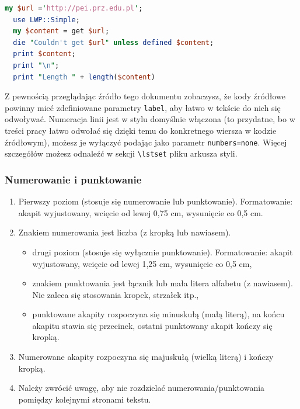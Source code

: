 \documentclass[12pt,twoside]{article}
\begin{document}
\begin{lstlisting}[language=Perl,caption=Listing programu Perl,label={KodPerl1}]
  my $url ='http://pei.prz.edu.pl';
  use LWP::Simple;
  my $content = get $url;
  die "Couldn't get $url" unless defined $content;
  print $content;
  print "\n";
  print "Length " + length($content)
\end{lstlisting}

Z pewnością przeglądając źródło tego dokumentu zobaczysz, że kody źródłowe powinny mieć zdefiniowane parametry \verb|label|, aby łatwo w tekście do nich się odwoływać.
Numeracja linii jest w stylu domyślnie włączona (to przydatne, bo w treści pracy łatwo odwołać się dzięki temu do konkretnego wiersza w kodzie źródłowym), możesz je wyłączyć podając jako parametr \verb|numbers=none|. Więcej szczegółów możesz odnaleźć w sekcji \verb|\lstset| pliku arkusza styli. 


\subsubsection{Numerowanie i punktowanie}

\begin{enumerate}[label=\arabic*), leftmargin=1.25cm]
	\item Pierwszy poziom (stosuje się numerowanie lub punktowanie). Formatowanie:
	akapit wyjustowany, wcięcie od lewej 0,75 cm, wysunięcie co 0,5 cm.
	\item Znakiem numerowania jest liczba (z kropką lub nawiasem).
		\begin{itemize}[label=-,labelsep=0.4cm,leftmargin=0.6cm]
			\item drugi poziom (stosuje się wyłącznie punktowanie). Formatowanie: akapit
			wyjustowany, wcięcie od lewej 1,25 cm, wysunięcie co 0,5 cm,
			\item znakiem punktowania jest łącznik lub mała litera alfabetu (z nawiasem). Nie
			zaleca się stosowania kropek, strzałek itp.,
			\item punktowane akapity rozpoczyna się minuskułą (małą literą), na końcu akapitu
			stawia się przecinek, ostatni punktowany akapit kończy się kropką.
		\end{itemize}
	\item Numerowane akapity rozpoczyna się majuskułą (wielką literą) i kończy kropką.
	\item Należy zwrócić uwagę, aby nie rozdzielać numerowania/punktowania pomiędzy
	kolejnymi stronami tekstu.
\end{enumerate}
\end{document}

